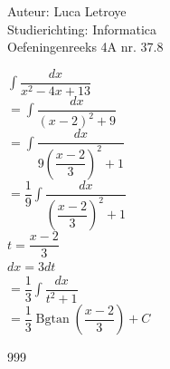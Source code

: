 \documentclass[a4paper]{article}
\newcommand{\bgtan}{\operatorname{Bgtan}}
\begin{document}
  
\noindent \large Auteur: Luca Letroye \\
\noindent \large Studierichting: Informatica\\
\noindent \large Oefeningenreeks 4A nr. 37.8

\medskip
\normalsize

$\displaystyle\int \dfrac{dx}{x^2-4x+13} $\\

$ = \displaystyle\int \dfrac{dx}{(x-2)^2+9} $\\

$ = \displaystyle\int \dfrac{dx}{9\left(\dfrac{x-2}{3}\right)^2 + 1} $\\

$ = \dfrac{1}{9}\displaystyle\int \dfrac{dx}{\left(\dfrac{x-2}{3}\right)^2 + 1} $\\

$t = \dfrac{x-2}{3} $\\

$dx = 3dt $\\

$ = \dfrac{1}{3}\displaystyle\int \dfrac{dx}{t^2 + 1} $\\

$ = \dfrac{1}{3}\bgtan \left(\dfrac{x-2}{3}\right) +C $\\


\begin{thebibliography}{999}
\end{thebibliography}
\end{document}
